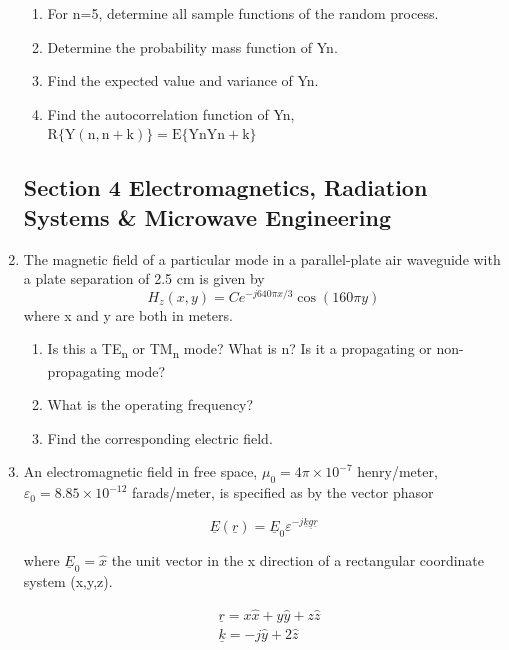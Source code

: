 \documentclass[main.tex]{subfiles}
\begin{document}
\begin{enumerate}
    \begin{enumerate}
        \item For n=5, determine all sample functions of the random process.
        \item Determine the probability mass function of Yn.
        \item Find the expected value and variance of Yn.
        \item Find the autocorrelation function of Yn, $\mathrm{R}\{\mathrm{Y}(\mathrm{n}, \mathrm{n}+\mathrm{k})\}=\mathrm{E}\{\mathrm{Yn} \mathrm{Yn}+\mathrm{k}\}$
    \end{enumerate}
    
\subsection{Section 4 Electromagnetics, Radiation Systems \& Microwave Engineering}

\item The magnetic field of a particular mode in a parallel-plate air waveguide with a plate separation of 2.5 cm is given by
$$H_{z}(x, y)=C e^{-j 640 \pi x / 3} \cos (160 \pi y)$$
where x and y are both in meters.
    
    \begin{enumerate}
        \item Is this a TE\textsubscript{n} or TM\textsubscript{n} mode? What is n? Is it a propagating or non-propagating mode?
        \item What is the operating frequency?
        \item Find the corresponding electric field.
    \end{enumerate}
    
\item An electromagnetic field in free space, $\mu_{0}=4 \pi \times 10^{-7}$ henry/meter, $\varepsilon_0 = 8.85 \times 10^{-12}$ farads/meter, is specified as by the vector phasor 

$$\underline{E}(\underline{r})=\underline{E}_{0} \varepsilon^{-j \underline{k} \underline{g} \underline{r}}$$

where $\underline{E}_{0}=\hat{x}$ the unit vector in the x direction of a rectangular coordinate system (x,y,z).

$$\begin{aligned}
&\underline{r}=x \hat{x}+y \hat{y}+z \hat{z} \\
&\underline{k}=-j \hat{y}+2 \hat{z}
\end{aligned}$$


\end{enumerate}
\end{document}
